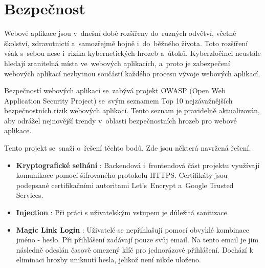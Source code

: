 \chapter{Bezpečnost}
Webové aplikace jsou v~dnešní době rozšířeny do~různých odvětví, včetně školství, zdravotnictí a~samozřejmě hojně i~do~běžného života. Toto rozšíření však s~sebou nese i~rizika kybernetických hrozeb a~útoků. Kyberzločinci neustále hledají zranitelná místa ve~webových aplikacích, a~proto je zabezpečení webových aplikací nezbytnou součástí každého procesu vývoje webových aplikací. \par
Bezpečností webových aplikací se~zabývá projekt OWASP \cite{owasp}(Open Web Application Security Project) se~svým seznamem Top 10 nejzávažnějších \cite{owasp10} bezpečnostních rizik webových aplikací. Tento seznam je pravidelně aktualizován, aby odrážel nejnovější trendy v~oblasti bezpečnostních hrozeb pro webové aplikace.\par
Tento projekt se~snaží o~řešení těchto bodů. Zde jsou některá navržená řešení.\par

\begin{itemize}
    \item \textbf{Kryptografické selhání} \cite{crypto}: Backendová i~frontendová část projektu využívají komunikace pomocí šifrovaného protokolu HTTPS. Certifikáty jsou podepsané certifikačními autoritami Let's~Encrypt a~Google Trusted Services.
    \item \textbf{Injection} \cite{nosqlinjection}: Při práci s uživatelským vstupem je důležitá sanitizace.
    \item \textbf{Magic Link Login} \cite{magiclinklogin}: Uživatelé se nepřihlašují pomocí obvyklé kombinace jméno - heslo. Při přihlášení zadávají pouze svůj email. Na tento email je jim následně odeslán časově omezený klíč pro jednorázové přihlášení. Dochází k eliminaci hrozby uniknutí hesla, jelikož není nikde uloženo.
\end{itemize}